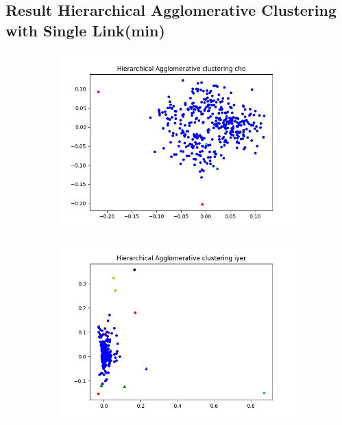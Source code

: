 \documentclass[fleqn]{llncs}
\begin{document}
\subsection{Result Hierarchical Agglomerative Clustering with Single Link(min)}




\begin{figure}
	\centering
	\begin{subfigure}{0.45\textwidth}
		\centering
		\includegraphics[width=\textwidth]{hiercho.jpg}
		\caption{}
		\label{Fig10_1}
	\end{subfigure}
	\begin{subfigure}{0.45\textwidth}
		\centering
		\includegraphics[width=\textwidth]{hieriyer.jpg}
		\caption{}
		\label{Fig10_2}
	\end{subfigure}
	\caption{}
	\label{fig10}
\end{figure}
\end{document}
